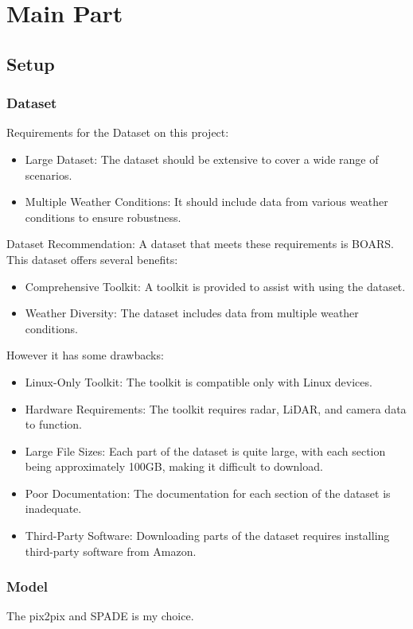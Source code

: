 \chapter{Main Part}
\section{Setup}
\subsection{Dataset}
Requirements for the Dataset on this project:
\begin{itemize}
    \item Large Dataset: The dataset should be extensive to cover a wide range of scenarios.
    \item Multiple Weather Conditions: It should include data from various weather conditions to ensure robustness.
\end{itemize}
Dataset Recommendation: A dataset that meets these requirements is BOARS.\\
This dataset offers several benefits:
\begin{itemize}
    \item Comprehensive Toolkit: A toolkit is provided to assist with using the dataset.
    \item Weather Diversity: The dataset includes data from multiple weather conditions.
\end{itemize}
However it has some drawbacks:
\begin{itemize}
    \item Linux-Only Toolkit: The toolkit is compatible only with Linux devices.
    \item Hardware Requirements: The toolkit requires radar, LiDAR, and camera data to function.
    \item Large File Sizes: Each part of the dataset is quite large, with each section being approximately 100GB, making it difficult to download.
    \item Poor Documentation: The documentation for each section of the dataset is inadequate.
    \item Third-Party Software: Downloading parts of the dataset requires installing third-party software from Amazon.
\end{itemize}

\subsection{Model}
The pix2pix and SPADE is my choice.